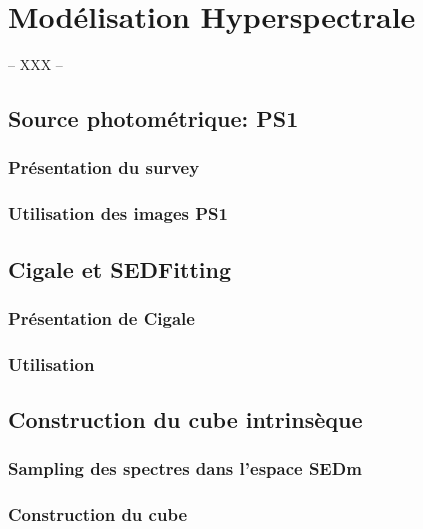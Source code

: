 \documentclass[../main/main.tex]{subfiles}
\begin{document}
\chapter{Modélisation Hyperspectrale}\label{ch:sedfit}

-- XXX --

\minitoc
\newpage

\section{Source photométrique: PS1}

\subsection{Présentation du survey}

\subsection{Utilisation des images PS1}


\section{Cigale et SEDFitting}

\subsection{Présentation de Cigale}

\subsection{Utilisation}

\section{Construction du cube intrinsèque}

\subsection{Sampling des spectres dans l'espace SEDm}

\subsection{Construction du cube}
\end{document}
